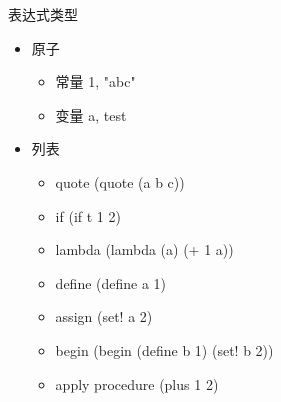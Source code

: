 \documentclass[presentation, bigger]{beamer}
\begin{document}
\begin{frame}[label={sec:org4dc3947}]{表达式类型}
\begin{itemize}
\item 原子
\begin{itemize}
\item 常量 \alert{1}, \alert{"abc"}
\item 变量 \alert{a}, \alert{test}
\end{itemize}
\item 列表
\begin{itemize}
\item quote \alert{(quote (a b c))}
\item if \alert{(if t 1 2)}
\item lambda \alert{(lambda (a) (+ 1 a))}
\item define \alert{(define a 1)}
\item assign \alert{(set! a 2)}
\item begin \alert{(begin (define b 1) (set! b 2))}
\item apply procedure \alert{(plus 1 2)}
\end{itemize}
\end{itemize}
\end{frame}
\end{document}
